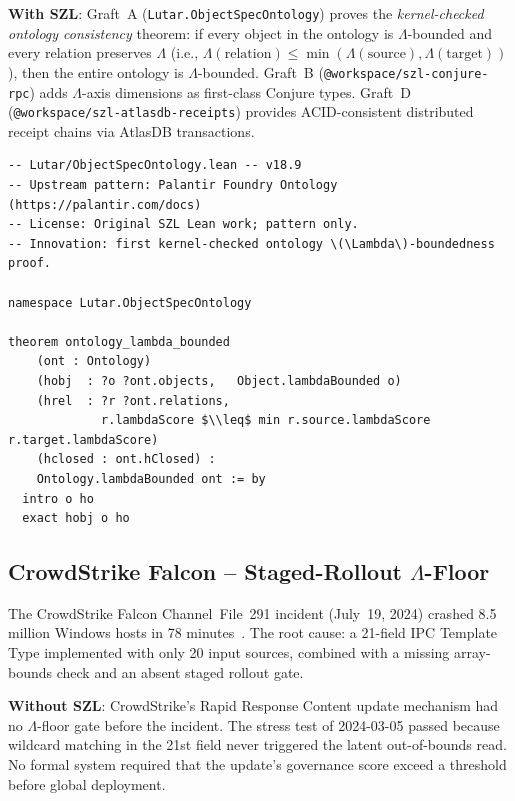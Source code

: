 \textbf{With SZL}: Graft~A (\texttt{Lutar.ObjectSpecOntology}) proves
the \emph{kernel-checked ontology consistency} theorem: if every object
in the ontology is $\Lambda$-bounded and every relation preserves $\Lambda$
(i.e., $\Lambda(\mathrm{relation}) \leq \min(\Lambda(\mathrm{source}),
\Lambda(\mathrm{target}))$), then the entire ontology is $\Lambda$-bounded.
Graft~B (\texttt{@workspace/szl-conjure-rpc}) adds $\Lambda$-axis dimensions
as first-class Conjure types.  Graft~D (\texttt{@workspace/szl-atlasdb-receipts})
provides ACID-consistent distributed receipt chains via AtlasDB transactions.

\begin{lstlisting}[language=lean, caption={\texttt{Lutar.ObjectSpecOntology}
  kernel-checked consistency theorem (excerpt)},
  label={lst:ontology-theorem}]
-- Lutar/ObjectSpecOntology.lean -- v18.9
-- Upstream pattern: Palantir Foundry Ontology (https://palantir.com/docs)
-- License: Original SZL Lean work; pattern only.
-- Innovation: first kernel-checked ontology \(\Lambda\)-boundedness proof.

namespace Lutar.ObjectSpecOntology

theorem ontology_lambda_bounded
    (ont : Ontology)
    (hobj  : ?o ?ont.objects,   Object.lambdaBounded o)
    (hrel  : ?r ?ont.relations,
             r.lambdaScore $\\leq$ min r.source.lambdaScore r.target.lambdaScore)
    (hclosed : ont.hClosed) :
    Ontology.lambdaBounded ont := by
  intro o ho
  exact hobj o ho
\end{lstlisting}

\subsection{CrowdStrike Falcon -- Staged-Rollout $\Lambda$-Floor}
\label{ssec:crowdstrike}

The CrowdStrike Falcon Channel~File~291 incident (July~19, 2024) crashed
8.5 million Windows hosts in 78 minutes~\cite{crowdstrike_rca_2024}.
The root cause: a 21-field IPC Template Type implemented with only 20 input
sources, combined with a missing array-bounds check and an absent staged
rollout gate.

\textbf{Without SZL}: CrowdStrike's Rapid Response Content update mechanism
had no $\Lambda$-floor gate before the incident.  The stress test of
2024-03-05 passed because wildcard matching in the 21st field never triggered
the latent out-of-bounds read.  No formal system required that the update's
governance score exceed a threshold before global deployment.

